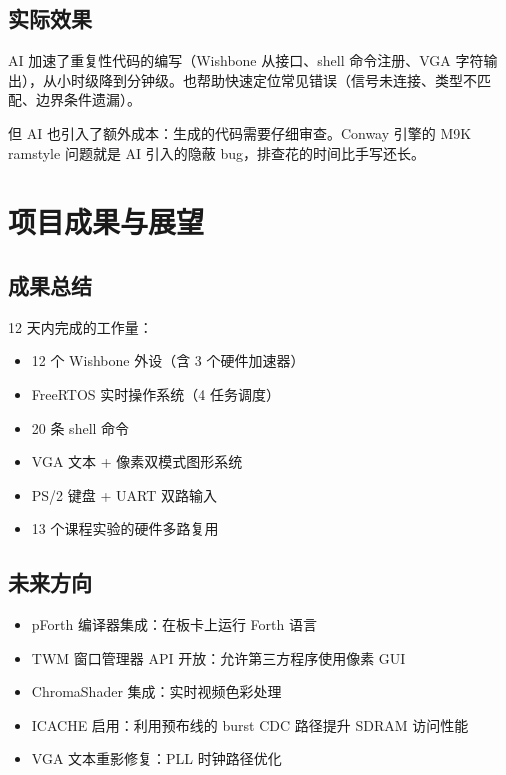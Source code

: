 \documentclass{SYSUReport}
\begin{document}
\subsection{实际效果}

AI 加速了重复性代码的编写（Wishbone 从接口、shell 命令注册、VGA 字符输出），从小时级降到分钟级。也帮助快速定位常见错误（信号未连接、类型不匹配、边界条件遗漏）。

但 AI 也引入了额外成本：生成的代码需要仔细审查。Conway 引擎的 M9K ramstyle 问题就是 AI 引入的隐蔽 bug，排查花的时间比手写还长。


\section{项目成果与展望}

\subsection{成果总结}

12 天内完成的工作量：

\begin{itemize}
    \item 12 个 Wishbone 外设（含 3 个硬件加速器）
    \item FreeRTOS 实时操作系统（4 任务调度）
    \item 20 条 shell 命令
    \item VGA 文本 + 像素双模式图形系统
    \item PS/2 键盘 + UART 双路输入
    \item 13 个课程实验的硬件多路复用
\end{itemize}

\subsection{未来方向}

\begin{itemize}
    \item pForth 编译器集成：在板卡上运行 Forth 语言
    \item TWM 窗口管理器 API 开放：允许第三方程序使用像素 GUI
    \item ChromaShader 集成：实时视频色彩处理
    \item ICACHE 启用：利用预布线的 burst CDC 路径提升 SDRAM 访问性能
    \item VGA 文本重影修复：PLL 时钟路径优化
\end{itemize}


\newpage


\end{document}
